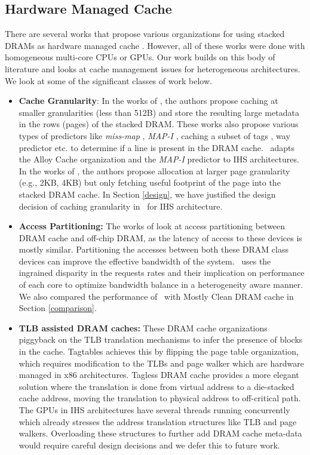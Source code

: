 \subsection{Hardware Managed Cache}
There are several works that propose various organizations for using stacked DRAMs as hardware managed cache \cite{loh-hill,alloy,bimodal,atcache,mostly-clean,bear,tagless-dramcache}. However, all of these works were done with homogeneous multi-core CPUs or GPUs. Our work builds on this body of literature and looks at cache management issues for heterogeneous architectures. We look at some of the significant classes of work below.
\begin{itemize}
\item \textbf{Cache Granularity}: In the works of \cite{loh-hill,alloy,atcache,bimodal}, the authors propose caching at smaller granularities (less than 512B) and store the resulting large metadata in the rows (pages) of the stacked DRAM. These works also propose various types of predictors like \textit{miss-map} \cite{loh-hill}, \textit{MAP-I} \cite{alloy}, caching a subset of tags \cite{atcache}, way predictor \cite{bimodal} etc. to determine if a line is present in the DRAM cache. \cachename\ adapts the Alloy Cache organization and the \textit{MAP-I} predictor \cite{alloy} to IHS architectures. In the works of \cite{footprint}, the authors propose allocation at larger page granularity (e.g., 2KB, 4KB) but only fetching useful footprint of the page into the stacked DRAM cache. In Section \ref{design}, we have justified the design decision of caching granularity in \cachename\ for IHS architecture.

\item \textbf{Access Partitioning:} The works of \cite{mostly-clean,mainak-hpca,micro-refresh,bear} look at access partitioning between DRAM cache and off-chip DRAM, as the latency of access to these devices is mostly similar. Partitioning the accesses between both these DRAM class devices can improve the effective bandwidth of the system. \cachename\ uses the ingrained disparity in the requests rates and their implication on performance of each core to optimize bandwidth balance in a heterogeneity aware manner. We also compared the performance of \cachename\ with Mostly Clean DRAM cache \cite{mostly-clean} in Section \ref{comparison}.

\item \textbf{TLB assisted DRAM caches:} These DRAM cache organizations piggyback on the TLB translation mechanisms to infer the presence of blocks in the cache. Tagtables \cite{tag-tables} achieves this by flipping the page table organization, which requires modification to the TLBs and page walker which are hardware managed in x86 architectures. Tagless DRAM cache \cite{tagless-dramcache} provides a more elegant solution where the translation is done from virtual address to a die-stacked cache address, moving the translation to physical address to off-critical path. The GPUs in IHS architectures have several threads running concurrently which already stresses the address translation structures like TLB and page walkers. Overloading these structures to further add DRAM cache meta-data would require careful design decisions and we defer this to future work.


\end{itemize}
